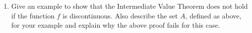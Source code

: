 \documentclass[9pt, a4paper, oneside]{amsart}
\begin{document}
\begin{questions}[resume]
\begin{enumerate}
		\item Give an example to show that the Intermediate Value Theorem does not hold if the function $ f$ is discontinuous. Also describe the set $ A$, defined as above, for your example and explain why the above proof fails for this case.
	\end{enumerate}



\end{questions}
\end{document}
